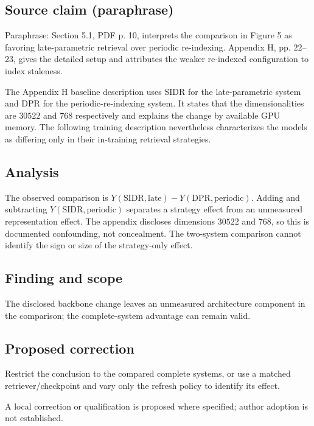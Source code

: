 \documentclass[11pt]{article}
\begin{document}
\subsection*{Source claim (paraphrase)}

Paraphrase: Section 5.1, PDF p. 10, interprets the comparison in Figure 5 as favoring late-parametric retrieval over periodic re-indexing. Appendix H, pp. 22–23, gives the detailed setup and attributes the weaker re-indexed configuration to index staleness.

The Appendix H baseline description uses SIDR for the late-parametric system and DPR for the periodic-re-indexing system. It states that the dimensionalities are \(30522\) and \(768\) respectively and explains the change by available GPU memory. The following training description nevertheless characterizes the models as differing only in their in-training retrieval strategies.

\subsection*{Analysis}

The observed comparison is \(Y(\mathrm{SIDR},\mathrm{late})-Y(\mathrm{DPR},\mathrm{periodic})\). Adding and subtracting \(Y(\mathrm{SIDR},\mathrm{periodic})\) separates a strategy effect from an unmeasured representation effect. The appendix discloses dimensions \(30522\) and \(768\), so this is documented confounding, not concealment. The two-system comparison cannot identify the sign or size of the strategy-only effect.

\subsection*{Finding and scope}

The disclosed backbone change leaves an unmeasured architecture component in the comparison; the complete-system advantage can remain valid.

\subsection*{Proposed correction}

Restrict the conclusion to the compared complete systems, or use a matched retriever/checkpoint and vary only the refresh policy to identify its effect.

A local correction or qualification is proposed where specified; author adoption is not established.
\end{document}
